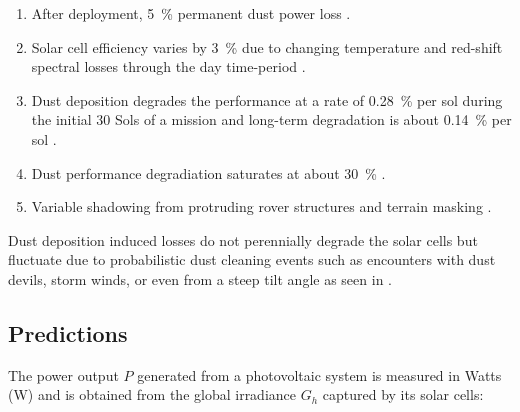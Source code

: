 \begin{enumerate}[label=\textcolor{BulletBlue}{(\alph*)}]
  \item\label{itm:pr:perm_loss}After deployment, \SI{5}{\percent} permanent dust power loss .
  \item\label{itm:pr:temp}Solar cell efficiency varies by \SI{3}{\percent} due to changing temperature and red-shift spectral losses through the day time-period .
  \item\label{itm:pr:deposition}Dust deposition degrades the performance at a rate of \SI{0.28}{\percent} per sol during the initial 30 Sols of a mission and long-term degradation is about \SI{0.14}{\percent} per sol .
  \item\label{itm:pr:saturation}Dust performance degradiation saturates at about \SI{30}{\percent} .
  \item\label{itm:pr:shadowing}Variable shadowing from protruding rover structures  and terrain masking .
\end{enumerate}


Dust deposition induced losses do not perennially degrade the solar cells but fluctuate due to probabilistic dust cleaning events such as encounters with dust devils, storm winds, or even from a steep tilt angle as seen in .

\subsection{Predictions}
\label{sec:PowerAndEnergyPredictions:Predictions}

The power output $P$ generated from a photovoltaic system is measured in Watts (\si{\watt}) and is obtained from the global irradiance $G_{h}$ captured by its solar cells:

